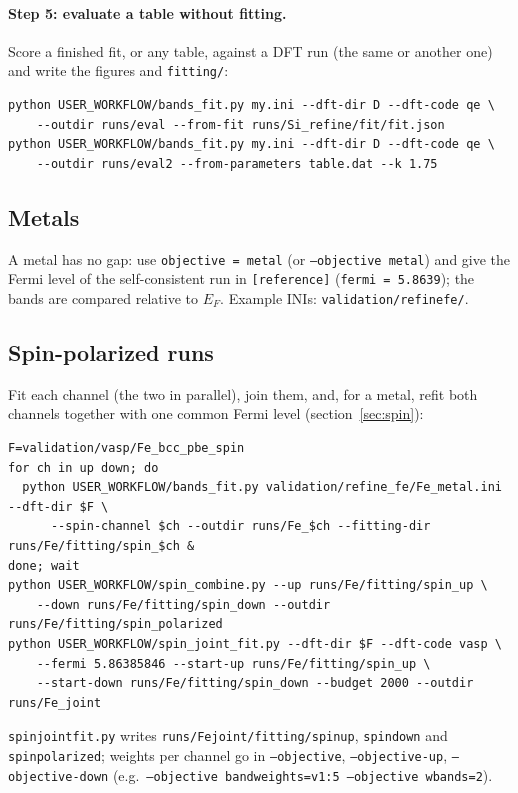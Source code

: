 \documentclass[11pt,a4paper]{article}
\newcommand{\cmd}[1]{\texttt{#1}}
\renewcommand{\_}{\origunderscore\allowbreak}
\begin{document}
\paragraph{Step 5: evaluate a table without fitting.} Score a finished fit, or any table, against a DFT run (the same or
another one) and write the figures and \cmd{fitting/}:
\begin{lstlisting}[style=sh]
python USER_WORKFLOW/bands_fit.py my.ini --dft-dir D --dft-code qe \
    --outdir runs/eval --from-fit runs/Si_refine/fit/fit.json
python USER_WORKFLOW/bands_fit.py my.ini --dft-dir D --dft-code qe \
    --outdir runs/eval2 --from-parameters table.dat --k 1.75
\end{lstlisting}

\subsection{Metals}
A metal has no gap: use \cmd{objective = metal} (or \cmd{--objective metal}) and give the Fermi level of the self-consistent
run in \cmd{[reference]} (\cmd{fermi = 5.8639}); the bands are compared relative to $E_F$. Example INIs:
\cmd{validation/refine\_fe/}.

\subsection{Spin-polarized runs}
Fit each channel (the two in parallel), join them, and, for a metal, refit both channels together with one common Fermi level
(section~\ref{sec:spin}):
\begin{lstlisting}[style=sh]
F=validation/vasp/Fe_bcc_pbe_spin
for ch in up down; do
  python USER_WORKFLOW/bands_fit.py validation/refine_fe/Fe_metal.ini --dft-dir $F \
      --spin-channel $ch --outdir runs/Fe_$ch --fitting-dir runs/Fe/fitting/spin_$ch &
done; wait
python USER_WORKFLOW/spin_combine.py --up runs/Fe/fitting/spin_up \
    --down runs/Fe/fitting/spin_down --outdir runs/Fe/fitting/spin_polarized
python USER_WORKFLOW/spin_joint_fit.py --dft-dir $F --dft-code vasp \
    --fermi 5.86385846 --start-up runs/Fe/fitting/spin_up \
    --start-down runs/Fe/fitting/spin_down --budget 2000 --outdir runs/Fe_joint
\end{lstlisting}
\cmd{spin\_joint\_fit.py} writes \cmd{runs/Fe\_joint/fitting/spin\_up}, \cmd{spin\_down} and \cmd{spin\_polarized}; weights per
channel go in \cmd{--objective}, \cmd{--objective-up}, \cmd{--objective-down} (e.g.\ \cmd{--objective band\_weights=v1:5
--objective w\_bands=2}).
\end{document}
